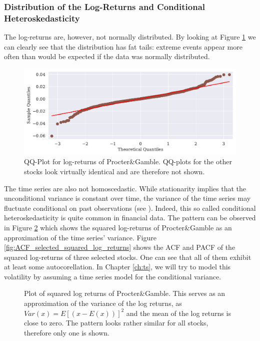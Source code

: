 \subsubsection{Distribution of the Log-Returns and Conditional Heteroskedasticity}
The log-returns are, however, not normally distributed. By looking at Figure \ref{fig:PG_qq_fd_log_adjclose} we can clearly see that the distribution has fat tails: extreme events appear more often than would be expected if the data was normally distributed. 
\begin{figure}[h!]
    \centering
    \begin{adjustbox}{width=.9\textwidth,center}
    \includegraphics[]{figures/PG_log_adjclose_fd_and_qq.pdf}
    \end{adjustbox}  
    \caption{QQ-Plot for log-returns of Procter\&Gamble. QQ-plots for the other stocks look virtually identical and are therefore not shown.}
    \label{fig:PG_qq_fd_log_adjclose}
\end{figure}
The time series are also not homoscedastic. While stationarity implies that the unconditional variance is constant over time, the variance of the time series may fluctuate conditional on past observations (see \citep{engle_autoregressive_1982}). Indeed, this so called conditional heteroskedasticity is quite common in financial data. The pattern can be observed in Figure \ref{fig:PG_squared_log_returns} which shows the squared log-returns of Procter\&Gamble as an approximation of the time series' variance. Figure \ref{fig:ACF_selected_squared_log_returns} shows the ACF and PACF of the squared log-returns of three selected stocks. One can see that all of them exhibit at least some autocorellation. In Chapter \ref{ch:ts}, we will try to model this volatility by assuming a time series model for the conditional variance. 

\begin{figure}[h!]
    \centering
    \begin{adjustbox}{width=.80\textwidth,center}
    
    \end{adjustbox}  
    \caption{Plot of squared log returns of Procter\&Gamble. This serves as an approximation of the variance of the log returns, as $Var(x) = E [(x - E(x))]^2$ and the mean of the log returns is close to zero. The pattern looks rather similar for all stocks, therefore only one is shown.}
    \label{fig:PG_squared_log_returns}
\end{figure}{}

